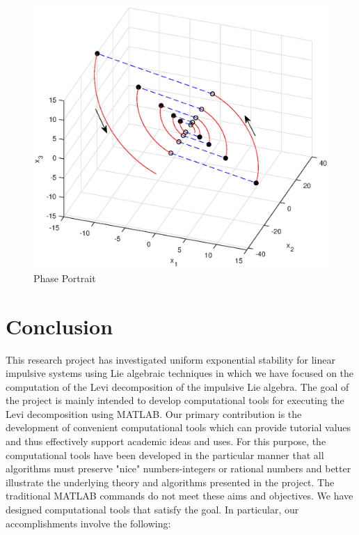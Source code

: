 \documentclass[11pt,a4paper]{article}
\begin{document}
\begin{figure}
\centering
\includegraphics[scale=0.7]{FG13.eps} 
\caption{Phase Portrait}
\end{figure}

%
\pagebreak
\section{Conclusion}
\qquad This research project has investigated uniform exponential stability for linear impulsive systems using Lie algebraic techniques in which we have focused on the computation of the Levi decomposition of the impulsive Lie algebra. The goal of the project is mainly intended to develop computational tools for executing the Levi decomposition using MATLAB. Our primary contribution is the development of convenient computational tools which can provide tutorial values and thus effectively support academic ideas and uses. For this purpose, the computational tools have been developed in the particular manner that all algorithms must preserve "nice" numbers-integers or rational numbers and better illustrate the underlying theory and algorithms presented in the project. The traditional MATLAB commands do not meet these aims and objectives. We have designed computational tools that satisfy the goal. In particular, our accomplishments involve the following:
\end{document}
